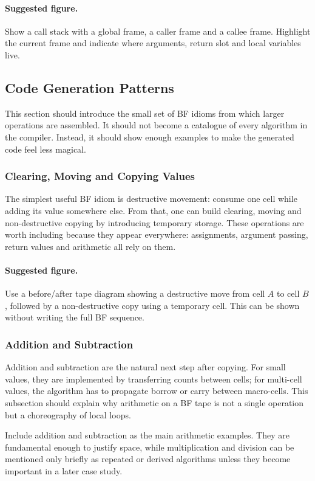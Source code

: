 \paragraph{Suggested figure.}
Show a call stack with a global frame, a caller frame and a callee frame. Highlight the current frame and indicate where arguments, return slot and local variables live.

\subsection{Code Generation Patterns}
This section should introduce the small set of BF idioms from which larger operations are assembled. It should not become a catalogue of every algorithm in the compiler. Instead, it should show enough examples to make the generated code feel less magical.

\subsubsection{Clearing, Moving and Copying Values}
The simplest useful BF idiom is destructive movement: consume one cell while adding its value somewhere else. From that, one can build clearing, moving and non-destructive copying by introducing temporary storage. These operations are worth including because they appear everywhere: assignments, argument passing, return values and arithmetic all rely on them.

\paragraph{Suggested figure.}
Use a before/after tape diagram showing a destructive move from cell \(A\) to cell \(B\), followed by a non-destructive copy using a temporary cell. This can be shown without writing the full BF sequence.

\subsubsection{Addition and Subtraction}
Addition and subtraction are the natural next step after copying. For small values, they are implemented by transferring counts between cells; for multi-cell values, the algorithm has to propagate borrow or carry between macro-cells. This subsection should explain why arithmetic on a BF tape is not a single operation but a choreography of local loops.

Include addition and subtraction as the main arithmetic examples. They are fundamental enough to justify space, while multiplication and division can be mentioned only briefly as repeated or derived algorithms unless they become important in a later case study.

